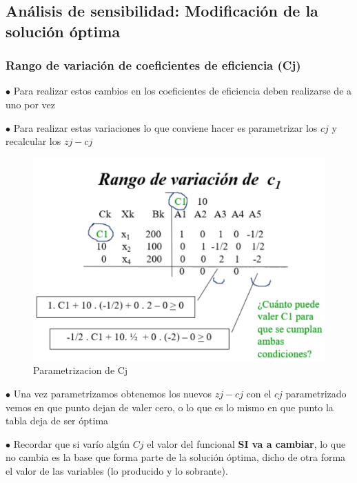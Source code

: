 \documentclass[titlepage,a4paper]{article}
\begin{document}
\vspace{0.5cm}

\subsection{Análisis de sensibilidad: Modificación de la solución óptima}


\subsubsection{Rango de variación de coeficientes de eficiencia (Cj)}


$\bullet$ Para realizar estos cambios en los coeficientes de eficiencia deben realizarse de a uno por vez

$\bullet$ Para realizar estas variaciones lo que conviene hacer es parametrizar los $cj$ y recalcular los $zj - cj$

\begin{figure}[H]
    \centering
    \includegraphics[scale=0.36]{parametrizacion_de_cj.png}
    \caption{Parametrizacion de Cj}
\end{figure}

$\bullet$ Una vez parametrizamos obtenemos los nuevos $zj - cj$ con el $cj$ parametrizado vemos en que punto dejan de valer cero, o lo que es lo mismo en que punto la tabla deja de ser óptima

$\bullet$ Recordar que si varío algún $Cj$ el valor del funcional \textbf{SI va a cambiar}, lo que no cambia es la base que forma parte de la solución óptima, dicho de otra forma el valor de las variables (lo producido y lo sobrante).

\vspace{0.5cm}
\end{document}
